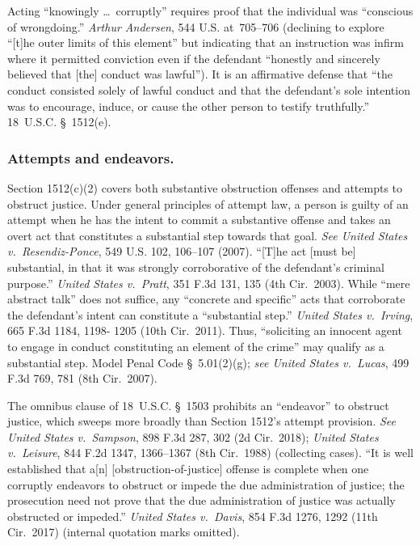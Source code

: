Acting ``knowingly \dots\ corruptly'' requires proof that the individual was ``conscious of wrongdoing.''
\textit{Arthur Andersen}, 544 U.S. at~705--706 (declining to explore ``[t]he outer limits of this element'' but indicating that an instruction was infirm where it permitted conviction even if the defendant ``honestly and sincerely believed that [the] conduct was lawful'').
It is an affirmative defense that ``the conduct consisted solely of lawful conduct and that the defendant's sole intention was to encourage, induce, or cause the other person to testify truthfully.''
18~U.S.C. \S~1512(e).

\subsubsection*{Attempts and endeavors.}

Section 1512(c)(2) covers both substantive obstruction offenses and attempts to obstruct justice. Under general principles of attempt law, a person is guilty of an attempt when he has the intent to commit a substantive offense and takes an overt act that constitutes a substantial step towards that goal.
\textit{See United States v.\ Resendiz-Ponce}, 549 U.S. 102, 106--107 (2007).
``[T]he act [must be] substantial, in that it was strongly corroborative of the defendant's criminal purpose.''
\textit{United States v.\ Pratt}, 351 F.3d 131, 135 (4th Cir.~2003).
While ``mere abstract talk'' does not suffice, any ``concrete and specific'' acts that corroborate the defendant's intent can constitute a ``substantial step.''
\textit{United States v.\ Irving}, 665 F.3d 1184, 1198- 1205 (10th Cir.~2011).
Thus, ``soliciting an innocent agent to engage in conduct constituting an element of the crime'' may qualify as a substantial step.
Model Penal Code \S~5.01(2)(g);
\textit{see United States v.\ Lucas}, 499 F.3d 769, 781 (8th Cir.~2007).

The omnibus clause of 18~U.S.C. \S~1503 prohibits an ``endeavor'' to obstruct justice, which sweeps more broadly than Section 1512's attempt provision.
\textit{See United States v.\ Sampson}, 898 F.3d 287, 302 (2d Cir.~2018);
\textit{United States v.\ Leisure}, 844 F.2d 1347, 1366--1367 (8th Cir.~1988) (collecting cases).
``It is well established that a[n] [obstruction-of-justice] offense is complete when one corruptly endeavors to obstruct or impede the due administration of justice;
the prosecution need not prove that the due administration of justice was actually obstructed or impeded.''
\textit{United States v.\ Davis}, 854 F.3d 1276, 1292 (11th Cir.~2017) (internal quotation marks omitted).


